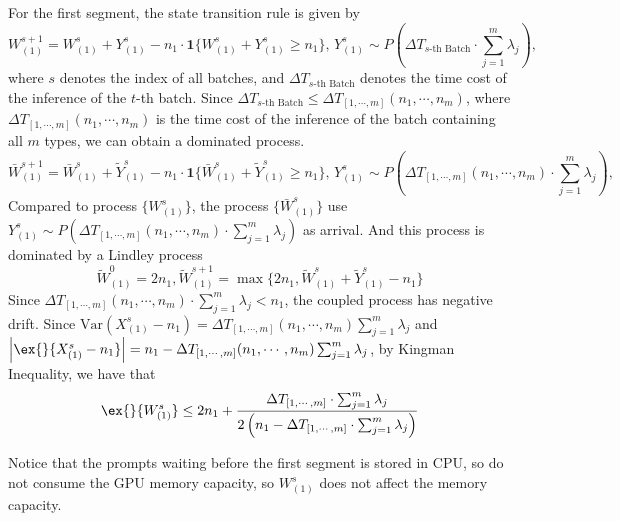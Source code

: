 For the first segment, the state transition rule is given by
$$ W^{s+1}_{(1)} =  W^s_{(1)} + Y^s_{(1)} -n_1\cdot  \mathbf{1}\{ W^s_{(1)} + Y^s_{(1)}\geq n_1 \},\, Y^s_{(1)}\sim P(\Delta T_{ s\text{-th Batch} }\cdot \sum_{j=1}^m \lambda_j), $$
where $s$ denotes the index of all batches, and $\Delta T_{s\text{-th Batch}}$ denotes the time cost of the inference of the $t$-th batch. Since $\Delta T_{s\text{-th Batch}}\leq \Delta T_{[1,\cdots,m]}(n_1,\cdots,n_m)$, where $\Delta T_{[1,\cdots,m]}(n_1,\cdots,n_m)$ is the time cost of the inference of the batch containing all $m$ types, we can obtain a dominated process.
$$ \bar{W}^{s+1}_{(1)} =  \bar{W}^s_{(1)} + \tilde{Y}^s_{(1)} -n_1\cdot  \mathbf{1}\{ \bar{W}^s_{(1)} + \tilde{Y}^s_{(1)}\geq n_1 \},\, Y^s_{(1)}\sim P(\Delta T_{[1,\cdots,m]}(n_1,\cdots,n_m)\cdot \sum_{j=1}^m \lambda_j), $$
Compared to process $\{W^s_{(1)}\}$, the process $\{ \bar{W}^s_{(1)} \}$ use $Y^s_{(1)}\sim P(\Delta T_{[1,\cdots,m]}(n_1,\cdots,n_m)\cdot \sum_{j=1}^m \lambda_j)$ as arrival. And this process is dominated by a Lindley process
$$\tilde{W}^0_{(1)}=2n_1,  \tilde{W}^{s+1}_{(1)}=\max\{2n_1, \tilde{W}^s_{(1)}+\tilde{Y}^s_{(1)}-n_1\}$$
Since $\Delta T_{[1,\cdots,m]}(n_1,\cdots,n_m)\cdot \sum_{j=1}^m \lambda_j<n_1$, the coupled process has negative drift.
Since $\text{Var}(X^s_{(1)} - n_1) = \Delta T_{[1,\cdots,m]}(n_1,\cdots,n_m)\sum_{j=1}^m \lambda_j$ and $\left|\ex{}{X^s_{(1)} - n_1}\right| = n_1 -\Delta T_{[1,\cdots,m]}(n_1,\cdots,n_m)\sum_{j=1}^m \lambda_j$, by Kingman Inequality, we have that
$$\ex{}{W^s_{(1)}}\leq 2n_1 + \frac{\Delta T_{ [1,\cdots,m] }\cdot \sum_{j=1}^m \lambda_j}{2\left( n_1 - \Delta T_{ [1,\cdots,m] }\cdot \sum_{j=1}^m \lambda_j\right)} $$

Notice that the prompts waiting before the first segment is stored in CPU, so do not consume the GPU memory capacity, so $W^s_{(1)}$ does not affect the memory capacity.

